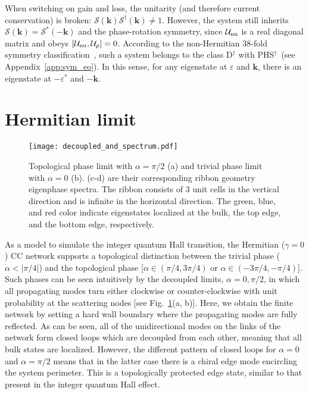 \documentclass[aps,pra,reprint,superscriptaddress,showkeys,amsmath,amssymb,longbibliography]{revtex4-1}
\begin{document}
When switching on gain and loss, the unitarity (and therefore current conservation) is broken: $\mathcal{S}(\textbf{k})\mathcal{S}^{\dagger}(\textbf{k})\neq 1$. 
However, the system still inherits $\mathcal{S}(\textbf{k})=\mathcal{S}^{*}(-\textbf{k})$ and the phase-rotation symmetry, since $\mathcal{U}_{\rm nu}$ is a real diagonal matrix and obeys $[\mathcal{U}_{\rm nu},\mathcal{U}_{p}]=0$.
According to the non-Hermitian $38$-fold symmetry classification~\cite{Kawabata2019b}, such a system belongs to the class D$^\dagger$ with PHS$^\dagger$~(see Appendix~\ref{app:sym_eo}). 
In this sense, for any eigenstate at $\varepsilon$ and $\textbf{k}$, there is an eigenstate at $-\varepsilon^{*}$ and $-\textbf{k}$.

\section{Hermitian limit}
\label{sec:top_phase}

\begin{figure}
\centering
\texttt{[image: decoupled\_and\_spectrum.pdf]}
\caption{Topological phase limit with $\alpha=\pi/2$ (a) and trivial phase limit with $\alpha=0$ (b). 
(c-d) are their corresponding ribbon geometry eigenphase spectra. 
The ribbon consists of 3 unit cells in the vertical direction and is infinite in the horizontal direction. 
The green, blue, and red color indicate eigenstates localized at the bulk, the top edge, and the bottom edge, respectively.
\label{fig: decoupled_limit}}
\end{figure}

As a model to simulate the integer quantum Hall transition, the Hermitian ($\gamma=0$) CC network supports a topological distinction between the trivial phase ($\alpha < |\pi/4|$) and the topological phase [$\alpha\in (\pi/4, 3\pi/4)$ or $\alpha\in (-3\pi/4, -\pi/4)$]. 
Such phases can be seen intuitively by the decoupled limits, $\alpha=0,\pi/2$, in which all propagating modes turn either clockwise or counter-clockwise with unit probability at the scattering nodes [see Fig.~\ref{fig: decoupled_limit}(a, b)]. 
Here, we obtain the finite network by setting a hard wall boundary where the propagating modes are fully reflected.
As can be seen, all of the unidirectional modes on the links of the network form closed loops which are decoupled from each other, meaning that all bulk states are localized. 
However, the different pattern of closed loops for $\alpha=0$ and $\alpha=\pi/2$ means that in the latter case there is a chiral edge mode encircling the system perimeter.
This is a topologically protected edge state, similar to that present in the integer quantum Hall effect.
\end{document}
